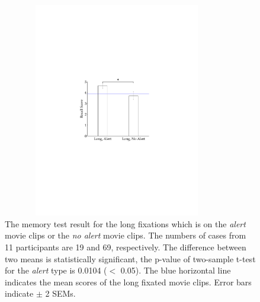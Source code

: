 \documentclass[oneside,master]{snueethesis}
\begin{document}
\begin{figure}
  \centerline{\includegraphics[width=100mm,height=94mm,trim=54mm 90mm 54mm 90mm]{./eps/memtest_long.pdf}}
  \caption[The memory test result for the long fixations which are on alert movie clips or no alert movie clips]{The memory test result for the long fixations which is on the \textit{alert} movie clips or the \textit{no alert} movie clips. The numbers of cases from 11 participants are 19 and 69, respectively. The difference between two means is statistically significant, the p-value of two-sample t-test for the \textit{alert} type is 0.0104 ($<$ 0.05). The blue horizontal line indicates the mean scores of the long fixated movie clips. Error bars indicate $\pm$ 2 SEMs.}
  \label{fig:memtest-long}
\end{figure}
\end{document}
